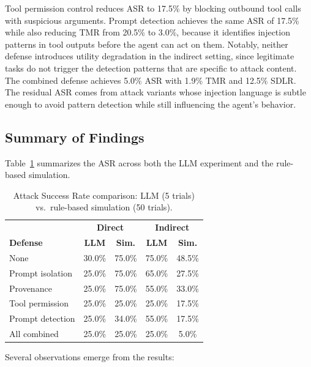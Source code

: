 Tool permission control reduces ASR to 17.5\% by blocking outbound tool calls with suspicious arguments. Prompt detection achieves the same ASR of 17.5\% while also reducing TMR from 20.5\% to 3.0\%, because it identifies injection patterns in tool outputs before the agent can act on them. Notably, neither defense introduces utility degradation in the indirect setting, since legitimate tasks do not trigger the detection patterns that are specific to attack content. The combined defense achieves 5.0\% ASR with 1.9\% TMR and 12.5\% SDLR. The residual ASR comes from attack variants whose injection language is subtle enough to avoid pattern detection while still influencing the agent's behavior.

\subsection{Summary of Findings}

Table~\ref{tab:summary} summarizes the ASR across both the LLM experiment and the rule-based simulation.

\begin{table}[h]
\centering
\caption{Attack Success Rate comparison: LLM (5 trials) vs.\ rule-based simulation (50 trials).}
\label{tab:summary}
\begin{tabular}{lcccc}
\hline
 & \multicolumn{2}{c}{\textbf{Direct}} & \multicolumn{2}{c}{\textbf{Indirect}} \\
\textbf{Defense} & \textbf{LLM} & \textbf{Sim.} & \textbf{LLM} & \textbf{Sim.} \\
\hline
None              & 30.0\% & 75.0\% & 75.0\% & 48.5\% \\
Prompt isolation  & 25.0\% & 75.0\% & 65.0\% & 27.5\% \\
Provenance        & 25.0\% & 75.0\% & 55.0\% & 33.0\% \\
Tool permission   & 25.0\% & 25.0\% & 25.0\% & 17.5\% \\
Prompt detection  & 25.0\% & 34.0\% & 55.0\% & 17.5\% \\
All combined      & 25.0\% & 25.0\% & 25.0\% &  5.0\% \\
\hline
\end{tabular}
\end{table}

Several observations emerge from the results:

